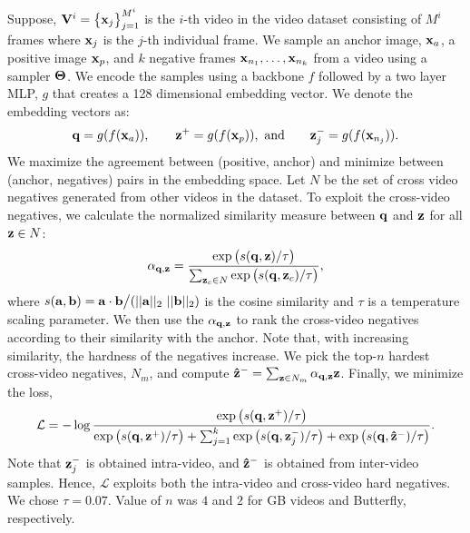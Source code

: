 %
Suppose, $\vb{V}^i = \big\{ \vb{x}_j\big\}_{j=1}^{M^i}$ is the $i$-th video in the video dataset consisting of $M^i$ frames where $\vb{x}_j$ is the $j$-th individual frame. We sample an anchor image, $\vb{x}_a$, a positive image $\vb{x}_p$, and $k$ negative frames $\vb{x}_{n_1}, \ldots, \vb{x}_{n_k}$ from a video using a sampler $\vb{\Theta}$. We encode the samples using a backbone $f$ followed by a two layer MLP, $g$ that creates a 128 dimensional embedding vector. We denote the embedding vectors as:
%
\begin{align}
    \vb{q} = g(f(\vb{x}_a)), \qquad
    \vb{z}^+ = g(f(\vb{x}_p)), ~ \text{and} \qquad
    \vb{z}_j^- = g(f(\vb{x}_{n_j})).
\end{align}
%
We maximize the agreement between (positive, anchor) and minimize between (anchor, negatives) pairs in the embedding space. Let $N$ be the set of cross video negatives generated from other videos in the dataset. To exploit the cross-video negatives, we calculate the normalized similarity measure between $\vb{q}$ and $\vb{z}$ for all $\vb{z} \in N$:
%
\begin{align}
    \alpha_{\vb{q},\vb{z}}= \frac{\exp\big(s(\vb{q}, \vb{z})/\tau\big)}{ \sum_{\vb{z}_c\in N}\exp\big(s(\vb{q}, \vb{z}_c)/\tau\big)},
\end{align}
%
where $s(\vb{a}, \vb{b}) = \vb{a}\cdot \vb{b}\big/(||\vb{a}||_2~ ||\vb{b}||_2)$ is the cosine similarity and $\tau$ is a temperature scaling parameter.
We then use the $\alpha_{\vb{q},\vb{z}}$ to rank the cross-video negatives according to their similarity with the anchor. Note that, with increasing similarity, the hardness of the negatives increase. We pick the top-$n$ hardest cross-video negatives, $N_m$, and compute $\vb{\hat{z}}^- = \sum_{\vb{z}\in N_m}{\alpha_{\vb{q},\vb{z}} \vb{z}}$. 
Finally, we minimize the loss,
%
\begin{align}
    \mathcal{L} = -\log \frac{\exp\big(s(\vb{q}, \vb{z}^+)/\tau\big)}{\exp\big(s(\vb{q}, \vb{z}^+)/\tau\big) + \sum_{j=1}^k\exp\big(s(\vb{q}, \vb{z}_j^-)/\tau\big) + \exp\big(s(\vb{q}, \vb{\hat{z}}^-)/\tau\big)}.
\label{eqn:loss_term}
\end{align}
%
Note that $\vb{z}_j^-$ is obtained intra-video, and $\vb{\hat{z}}^-$ is obtained from inter-video samples. Hence, $\mathcal{L}$ exploits both the intra-video and cross-video hard negatives. We chose $\tau\!=\!0.07$. Value of $n$ was $4$ and $2$ for GB videos and Butterfly, respectively.

